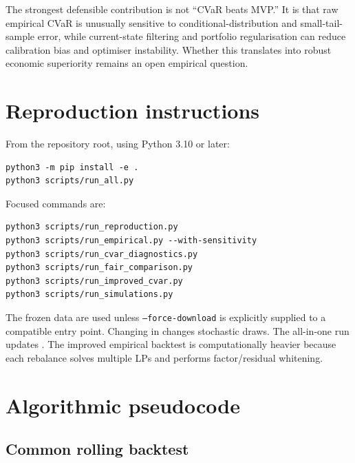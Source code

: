 \documentclass[11pt,a4paper]{article}
\newcommand{\code}[1]{\texttt{#1}}
\begin{document}
The strongest defensible contribution is not ``CVaR beats MVP.'' It is that raw empirical CVaR is unusually sensitive to conditional-distribution and small-tail-sample error, while current-state filtering and portfolio regularisation can reduce calibration bias and optimiser instability. Whether this translates into robust economic superiority remains an open empirical question.

\section{Reproduction instructions}

From the repository root, using Python 3.10 or later:
\begin{lstlisting}
python3 -m pip install -e .
python3 scripts/run_all.py
\end{lstlisting}

Focused commands are:
\begin{lstlisting}
python3 scripts/run_reproduction.py
python3 scripts/run_empirical.py --with-sensitivity
python3 scripts/run_cvar_diagnostics.py
python3 scripts/run_fair_comparison.py
python3 scripts/run_improved_cvar.py
python3 scripts/run_simulations.py
\end{lstlisting}

The frozen data are used unless \code{--force-download} is explicitly supplied to a compatible entry point. Changing  in  changes stochastic draws. The all-in-one run updates . The improved empirical backtest is computationally heavier because each rebalance solves multiple LPs and performs factor/residual whitening.

\appendix

\section{Algorithmic pseudocode}

\subsection{Common rolling backtest}
\end{document}

